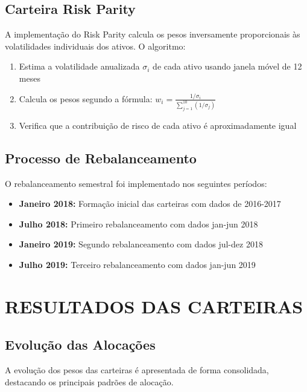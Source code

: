\subsection{Carteira Risk Parity}

A implementação do Risk Parity calcula os pesos inversamente proporcionais às volatilidades individuais dos ativos. O algoritmo:

\begin{enumerate}
    \item Estima a volatilidade anualizada $\sigma_i$ de cada ativo usando janela móvel de 12 meses
    \item Calcula os pesos segundo a fórmula: $w_i = \frac{1/\sigma_i}{\sum_{j=1}^{10}(1/\sigma_j)}$
    \item Verifica que a contribuição de risco de cada ativo é aproximadamente igual
\end{enumerate}

\subsection{Processo de Rebalanceamento}

O rebalanceamento semestral foi implementado nos seguintes períodos:
\begin{itemize}
    \item \textbf{Janeiro 2018:} Formação inicial das carteiras com dados de 2016-2017
    \item \textbf{Julho 2018:} Primeiro rebalanceamento com dados jan-jun 2018
    \item \textbf{Janeiro 2019:} Segundo rebalanceamento com dados jul-dez 2018
    \item \textbf{Julho 2019:} Terceiro rebalanceamento com dados jan-jun 2019
\end{itemize}

\section{RESULTADOS DAS CARTEIRAS}

\subsection{Evolução das Alocações}

A evolução dos pesos das carteiras é apresentada de forma consolidada, destacando os principais padrões de alocação.

